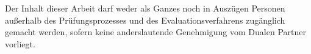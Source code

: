 Der Inhalt dieser Arbeit darf weder als Ganzes noch in Auszügen Personen
außerhalb des Prüfungsprozesses und des Evaluationsverfahrens zugänglich gemacht
werden, sofern keine anderslautende Genehmigung vom Dualen Partner vorliegt.
